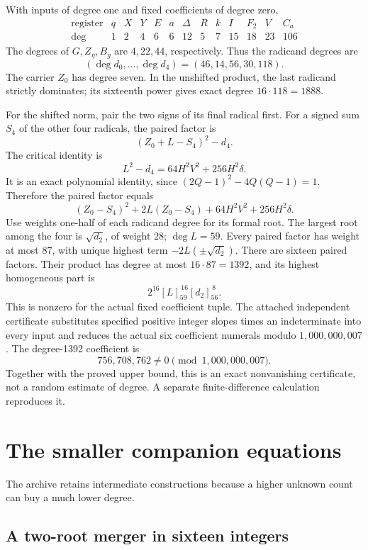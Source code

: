 \documentclass[11pt]{article}
\theoremstyle{remark}
\begin{document}
With inputs of degree one and fixed coefficients of degree zero,
\[
\begin{array}{c|rrrrrrrrrrrr}
\text{register}&q&X&Y&E&a&\Delta&R&k&I&F_2&V&C_a\\ \hline
\deg&1&2&4&6&6&12&5&7&15&18&23&106
\end{array}
\]
The degrees of \(G,Z_\eta,B_g\) are \(4,22,44\), respectively.
Thus the radicand degrees are
\[
 (\deg d_0,\ldots,\deg d_4)=(46,14,56,30,118).
\]
The carrier \(Z_0\) has degree seven. In the unshifted product, the last
radicand strictly dominates; its sixteenth power gives exact degree
\(16\cdot118=1888\).

For the shifted norm, pair the two signs of its final radical first.
For a signed sum \(S_4\) of the other four radicals, the paired factor is
\[
 (Z_0+L-S_4)^2-d_4.
\]
The critical identity is
\begin{equation}
 L^2-d_4=64H^2V^2+256H^2\delta.                            \label{eq:midpoint}
\end{equation}
It is an exact polynomial identity, since
\((2Q-1)^2-4Q(Q-1)=1\). Therefore the paired factor equals
\[
 (Z_0-S_4)^2+2L(Z_0-S_4)+64H^2V^2+256H^2\delta.
\]
Use weights one-half of each radicand degree for its formal root.
The largest root among the four is \(\sqrt{d_2}\), of weight \(28\);
\(\deg L=59\). Every paired factor has weight at most \(87\), with
unique highest term \(-2L(\pm\sqrt{d_2})\).
There are sixteen paired factors. Their product has degree at most
\(16\cdot87=1392\), and its highest homogeneous part is
\[
 \boxed{2^{16}[L]_{59}^{\,16}[d_2]_{56}^{\,8}.}
\]
This is nonzero for the actual fixed coefficient tuple.
The attached independent certificate substitutes specified positive integer
slopes times an indeterminate into every input and reduces the actual six
coefficient numerals modulo \(1{,}000{,}000{,}007\). The degree-1392
coefficient is
\[
 756{,}708{,}762\ne0\pmod{1{,}000{,}000{,}007}.
\]
Together with the proved upper bound, this is an exact nonvanishing
certificate, not a random estimate of degree. A separate finite-difference
calculation reproduces it.

\section{The smaller companion equations}

The archive retains intermediate constructions because a higher unknown
count can buy a much lower degree.

\subsection{A two-root merger in sixteen integers}
\end{document}
